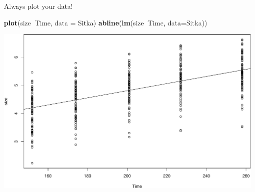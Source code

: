 \documentclass[
  ignorenonframetext,
]{beamer}
\newenvironment{Shaded}{\begin{snugshade}}{\end{snugshade}}
\newcommand{\DataTypeTok}[1]{\textcolor[rgb]{0.13,0.29,0.53}{#1}}
\newcommand{\KeywordTok}[1]{\textcolor[rgb]{0.13,0.29,0.53}{\textbf{#1}}}
\newcommand{\NormalTok}[1]{#1}
\newcommand{\OperatorTok}[1]{\textcolor[rgb]{0.81,0.36,0.00}{\textbf{#1}}}
\begin{document}
\begin{frame}[fragile]{Always plot your data!}
\protect\hypertarget{always-plot-your-data-1}{}

\begin{Shaded}
\begin{Highlighting}[]
\KeywordTok{plot}\NormalTok{(size}\OperatorTok{~}\NormalTok{Time, }\DataTypeTok{data =}\NormalTok{ Sitka)}
\KeywordTok{abline}\NormalTok{(}\KeywordTok{lm}\NormalTok{(size}\OperatorTok{~}\NormalTok{Time, }\DataTypeTok{data=}\NormalTok{Sitka))}
\end{Highlighting}
\end{Shaded}

\includegraphics[height=0.7\textheight]{review_files/figure-beamer/unnamed-chunk-12-1}

\end{frame}
\end{document}
